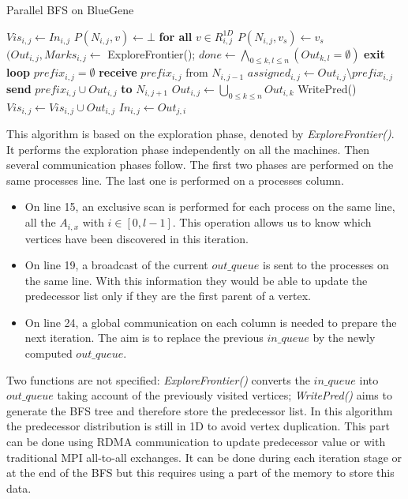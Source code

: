 \begin{algorithm}
\caption{Parallel BFS on BlueGene}\label{alg:bfs_bluegene}
\begin{algorithmic}[1]
\State $Vis_{i,j} \gets In_{i,j}$
\State $P(N_{i,j},v) \gets \bot$ \textbf{for all} $v \in R_{i,j}^{1D}$
\State $P(N_{i,j},v_s) \gets v_s$
\EndIf
{}
	\State$(Out_{i,j},Marks_{i,j} \gets $ ExploreFrontier();
	\State $done \gets \bigwedge\limits_{0 \leq k, l \leq n} (Out_{k,l} = \emptyset)$
		\State \textbf{exit loop}
	\EndIf
		\State $prefix_{i,j} = \emptyset$
	\Else 
		\State \textbf{receive} $prefix_{i,j}$ from $N_{i,j-1}$
	\EndIf
	\State $assigned_{i,j} \gets Out_{i,j} \setminus prefix_{i,j}$
		\State \textbf{send} $prefix_{i,j} \cup Out_{i,j}$ \textbf{to} $N_{i,j+1}$
	\EndIf
	\State $Out_{i,j} \gets \bigcup\limits_{0 \leq k \leq n} Out_{i,k}$
	\State WritePred()
	\State $Vis_{i,j} \gets Vis_{i,j} \cup Out_{i,j}$
	\State $In_{i,j} \gets Out_{j,i}$
\EndWhile
\end{algorithmic}
\end{algorithm}

This algorithm is based on the exploration phase, denoted by \textit{ExploreFrontier()}. It performs the exploration phase independently on all the machines.
Then several communication phases follow. 
The first two phases are performed on the same processes line. The last one is performed on a processes column. 
\begin{itemize}
	\item On line 15, an exclusive scan is performed for each process on the same line, all the $A_{i,x}$ with $i \in [0,l-1]$. 
	This operation allows us to know which vertices have been discovered in this iteration.
	\item On line  19, a broadcast of the current $out\_queue$ is sent to the processes on the same line. With this information they would be able to update the predecessor list only if they are the first parent of a vertex.
	\item On line 24, a global communication on each column is needed to prepare the next iteration. 
	The aim is to replace the previous $in\_queue$ by the newly computed $out\_queue$.
\end{itemize}

Two functions are not specified: 
\textit{ExploreFrontier()} converts the $in\_queue$ into $out\_queue$ taking account of the previously visited vertices;
\textit{WritePred()} aims to generate the BFS tree and therefore store the predecessor list. In this algorithm the predecessor distribution is still in 1D to avoid vertex duplication. 
	This part can be done using RDMA communication to update predecessor value or with traditional MPI all-to-all exchanges.
	It can be done during each iteration stage or at the end of the BFS but this requires using a part of the memory to store this data. 

